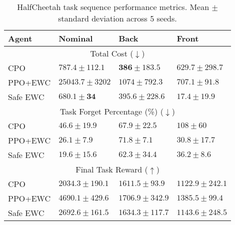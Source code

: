 \begin{table}[t]
\caption{HalfCheetah task sequence performance metrics. Mean $\pm$ standard deviation across 5 seeds.}
\centering
\label{tab:halfcheetah}
\begin{tabular}{@{}llll@{}}
\toprule
Agent & Nominal            & Back             & Front          \\ \midrule
\multicolumn{4}{c}{Total Cost ($\downarrow$)}                                           \\ \midrule
CPO       & $787.4 \pm 112.1$     & $\mathbf{386 \pm 183.5}$  & $629.7 \pm 298.7$ \\
PPO+EWC   & $25043.7 \pm 3202$ & $1074 \pm 792.3$ & $707.1 \pm 91.8$ \\
Safe EWC  & $\mathbf{680.1 \pm 34}$     & $395.6 \pm 228.6$  & $\mathbf{17.4 \pm 19.9}$  \\ \midrule
\multicolumn{4}{c}{Task Forget Percentage (\%) ($\downarrow$)}                                     \\ \midrule
CPO       & $46.6 \pm 19.9$      & $67.9 \pm 22.5$    & $108 \pm 60$  \\
PPO+EWC   & $26.1 \pm 7.9$      & $71.8 \pm 7.1$    & $\mathbf{30.8 \pm 17.7}$  \\
Safe EWC  & $\mathbf{19.6 \pm 15.6}$      & $\mathbf{62.3 \pm 34.4}$    & $36.2 \pm 8.6$  \\ \midrule
\multicolumn{4}{c}{Final Task Reward ($\uparrow$)}                                           \\ \midrule
CPO       & $2034.3 \pm 190.1$     & $1611.5 \pm 93.9$  & $1122.9 \pm 242.1$ \\
PPO+EWC   & $\mathbf{4690.1 \pm 429.6}$ & $\mathbf{1706.9 \pm 342.9}$ & $\mathbf{1385.5 \pm 99.4}$ \\
Safe EWC  & $2692.6 \pm 161.5$     & $1634.3 \pm 117.7$  & $1143.6 \pm 248.5$  \\ \bottomrule
\end{tabular}
\end{table}

